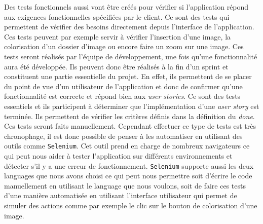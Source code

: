 \documentclass{article}
\begin{document}
Des tests fonctionnels aussi vont être créés pour vérifier si l'application répond aux exigences fonctionnelles spécifiées par le client. Ce sont des tests qui permettent de vérifier des besoins directement depuis l'interface de 
l'application. Ces tests peuvent par exemple servir à vérifier l'insertion d'une image, la colorisation d'un dossier d'image ou encore faire un zoom sur une image. Ces tests seront réalisés par l'équipe de développement, une fois qu'une fonctionnalité aura été développée.
Ils peuvent donc être réalisés à la fin d'un sprint et constituent une partie essentielle du projet. En effet, ils permettent de se placer du point de vue d'un utilisateur de l'application et donc de confirmer qu'une fonctionnalité est correcte et répond bien aux \textit{user stories}.
Ce sont des tests essentiels et ils participent à déterminer que l'implémentation d'une \textit{user story} est terminée. Ils permettent de vérifier les critères définis dans la définition du \textit{done}.
Ces tests seront faits manuellement. Cependant effectuer ce type de tests est très chronophage, il est donc possible de penser à les automatiser en utilisant des outils comme \texttt{Selenium}. 
Cet outil prend en charge de nombreux navigateurs ce qui peut nous aider à tester l'application sur différents environnements et détecter s'il y a une erreur de fonctionnement. 
\texttt{Selenium} supporte aussi les deux languages que nous avons choisi ce qui peut nous permettre soit d'écrire le code manuellement en utilisant le language que nous voulons, soit de faire ces tests d'une manière automatisée en utilisant l'interface utilisateur qui permet de simuler des actions comme par exemple le clic sur le bouton de colorisation d'une image.\\ %
\end{document}
